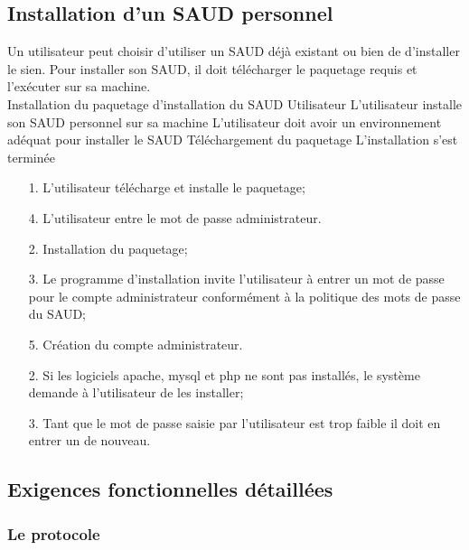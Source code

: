 \documentclass[a4paper,11pt,french]{article}
\begin{document}
\subsection{Installation d'un SAUD personnel}
Un utilisateur peut choisir d'utiliser un SAUD déjà existant ou bien
de d'installer le sien. Pour installer son SAUD, il doit télécharger
le paquetage requis et l'exécuter sur sa machine.\\

\fiche
	{Installation du paquetage d'installation du SAUD}
	{Utilisateur}
	{L'utilisateur installe son SAUD personnel sur sa machine}
	{L'utilisateur doit avoir un environnement adéquat pour installer le SAUD}
	{Téléchargement du paquetage}
	{L'installation s'est terminée}
	{\begin{itemize}
        \item[]
		\item[1.] L'utilisateur télécharge et installe le paquetage;
		\item[4.] L'utilisateur entre le mot de passe administrateur.
	\end{itemize}
	}
	{\begin{itemize}
        \item[]
		\item[2.] Installation du paquetage;
		\item[3.] Le programme d'installation invite l'utilisateur à entrer
		un mot de passe pour le compte administrateur conformément à la politique 
		des mots de passe du SAUD;
		\item[5.] Création du compte administrateur.
	\end{itemize}
	}
	{}
\flots
    {\begin{itemize}
    \item[]
    \item[2.] Si les logiciels apache, mysql et php ne sont pas installés, le 
    système demande à l'utilisateur de les installer;
    \item[3.] Tant que le mot de passe saisie par l'utilisateur est trop faible
    il doit en entrer un de nouveau.
    \end{itemize}
    }
	{}
	
\pagebreak
\subsection{Exigences fonctionnelles détaillées}

\subsubsection{Le protocole}
\end{document}
